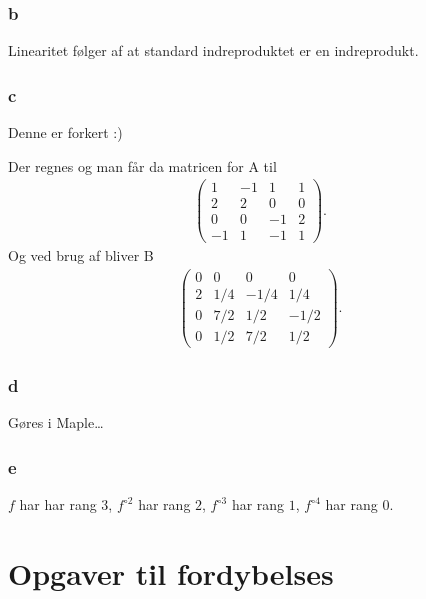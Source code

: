 			\subsubsection{b}

				Linearitet følger af at standard indreproduktet er en indreprodukt.

			\subsubsection{c}
			
			Denne er forkert :)

				Der regnes og man får da matricen for A til
					\begin{align*}
						\left(\begin{array}{rrrr} 1 & -1 & 1 & 1 \\ 2 & 2 & 0 & 0 \\ 0 & 0 & -1 & 2 \\ -1 & 1 & -1 & 1 \end{array}\right).
					\end{align*} 
				Og ved brug af \cite[Eksempel 4.4.16]{hesselholt2017} bliver B 
					\begin{align*}
						\left(\begin{array}{rrrr} 0 & 0 & 0 & 0 \\ 2 & 1/4 & -1/4 & 1/4 \\ 0 & 7/2 & 1/2 & -1/2 \\ 0 & 1/2 & 7/2 & 1/2 \end{array}\right).
					\end{align*} 

			\subsubsection{d}

				Gøres i Maple\ldots

			\subsubsection{e}

				$f$ har har rang $3$, $f^{\circ 2}$ har rang $2$, $f^{\circ 3}$ har rang $1$, $f^{\circ 4}$ har rang $0$.



	\section{Opgaver til fordybelses}

